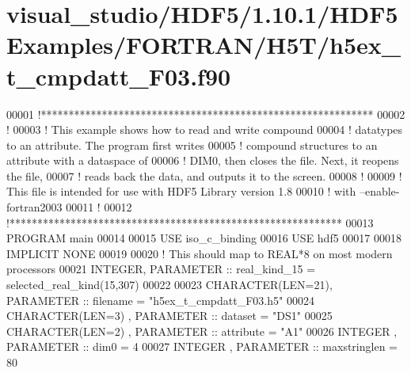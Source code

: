 \hypertarget{visual__studio_2_h_d_f5_21_810_81_2_h_d_f5_examples_2_f_o_r_t_r_a_n_2_h5_t_2h5ex__t__cmpdatt___f03_8f90_source}{}\section{visual\+\_\+studio/\+H\+D\+F5/1.10.1/\+H\+D\+F5\+Examples/\+F\+O\+R\+T\+R\+A\+N/\+H5\+T/h5ex\+\_\+t\+\_\+cmpdatt\+\_\+\+F03.f90}
\label{visual__studio_2_h_d_f5_21_810_81_2_h_d_f5_examples_2_f_o_r_t_r_a_n_2_h5_t_2h5ex__t__cmpdatt___f03_8f90_source}

\begin{DoxyCode}
00001 \textcolor{comment}{!************************************************************}
00002 \textcolor{comment}{!}
00003 \textcolor{comment}{!  This example shows how to read and write compound}
00004 \textcolor{comment}{!  datatypes to an attribute.  The program first writes}
00005 \textcolor{comment}{!  compound structures to an attribute with a dataspace of}
00006 \textcolor{comment}{!  DIM0, then closes the file.  Next, it reopens the file,}
00007 \textcolor{comment}{!  reads back the data, and outputs it to the screen.}
00008 \textcolor{comment}{!}
00009 \textcolor{comment}{!  This file is intended for use with HDF5 Library version 1.8}
00010 \textcolor{comment}{!  with --enable-fortran2003}
00011 \textcolor{comment}{!}
00012 \textcolor{comment}{!************************************************************}
00013 \textcolor{keyword}{PROGRAM} main
00014 
00015   \textcolor{keywordtype}{USE }iso\_c\_binding
00016   \textcolor{keywordtype}{USE }hdf5
00017 
00018   \textcolor{keywordtype}{IMPLICIT NONE}
00019 
00020   \textcolor{comment}{! This should map to REAL*8 on most modern processors}
00021   \textcolor{keywordtype}{INTEGER}, \textcolor{keywordtype}{PARAMETER} :: real\_kind\_15 = selected\_real\_kind(15,307)
00022 
00023   \textcolor{keywordtype}{CHARACTER(LEN=21)}, \textcolor{keywordtype}{PARAMETER} :: filename     = \textcolor{stringliteral}{"h5ex\_t\_cmpdatt\_F03.h5"}
00024   \textcolor{keywordtype}{CHARACTER(LEN=3)} , \textcolor{keywordtype}{PARAMETER} :: dataset      = \textcolor{stringliteral}{"DS1"}
00025   \textcolor{keywordtype}{CHARACTER(LEN=2)} , \textcolor{keywordtype}{PARAMETER} :: attribute    = \textcolor{stringliteral}{"A1"}
00026   \textcolor{keywordtype}{INTEGER}          , \textcolor{keywordtype}{PARAMETER} :: dim0         = 4
00027   \textcolor{keywordtype}{INTEGER}          , \textcolor{keywordtype}{PARAMETER} :: maxstringlen = 80

\end{DoxyCode}
